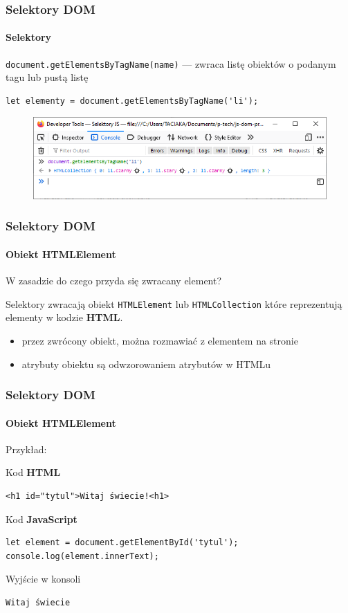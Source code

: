 \begin{frame}[fragile]
  \frametitle{Selektory DOM}
  \framesubtitle{Selektory}

  \verb|document.getElementsByTagName(name)| --- zwraca listę obiektów o podanym tagu lub pustą listę

  \begin{verbatim}
let elementy = document.getElementsByTagName('li');
  \end{verbatim}

  \begin{figure}
    \includegraphics[scale=0.55]{images/dom-selector-getelementsbytagname}
  \end{figure}

\end{frame}


\begin{frame}[fragile]
  \frametitle{Selektory DOM}
  \framesubtitle{Obiekt HTMLElement}

  W zasadzie do czego przyda się zwracany element?

  Selektory zwracają obiekt \verb|HTMLElement| lub \verb|HTMLCollection| które reprezentują elementy w kodzie \textbf{HTML}.

  \begin{itemize}
    \item przez zwrócony obiekt, można rozmawiać z elementem na stronie
    \item atrybuty obiektu są odwzorowaniem atrybutów w HTMLu
  \end{itemize}

\end{frame}


\begin{frame}[fragile]
  \frametitle{Selektory DOM}
  \framesubtitle{Obiekt HTMLElement}

  Przykład:

  Kod \textbf{HTML}
  \begin{verbatim}
<h1 id="tytul">Witaj świecie!<h1>
  \end{verbatim}

Kod \textbf{JavaScript}
  \begin{verbatim}
let element = document.getElementById('tytul');
console.log(element.innerText);
  \end{verbatim}

Wyjście w konsoli
  \begin{verbatim}
Witaj świecie
  \end{verbatim}

\end{frame}


